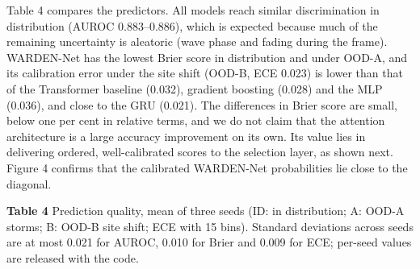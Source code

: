 \documentclass[
  11pt,
]{article}
\begin{document}
Table 4 compares the predictors. All models reach similar discrimination
in distribution (AUROC 0.883--0.886), which is expected because much of
the remaining uncertainty is aleatoric (wave phase and fading during the
frame). WARDEN-Net has the lowest Brier score in distribution and under
OOD-A, and its calibration error under the site shift (OOD-B, ECE 0.023)
is lower than that of the Transformer baseline (0.032), gradient
boosting (0.028) and the MLP (0.036), and close to the GRU (0.021). The
differences in Brier score are small, below one per cent in relative
terms, and we do not claim that the attention architecture is a large
accuracy improvement on its own. Its value lies in delivering ordered,
well-calibrated scores to the selection layer, as shown next. Figure 4
confirms that the calibrated WARDEN-Net probabilities lie close to the
diagonal.


\textbf{Table 4} Prediction quality, mean of three seeds (ID: in
distribution; A: OOD-A storms; B: OOD-B site shift; ECE with 15 bins).
Standard deviations across seeds are at most 0.021 for AUROC, 0.010 for
Brier and 0.009 for ECE; per-seed values are released with the code.
\end{document}
